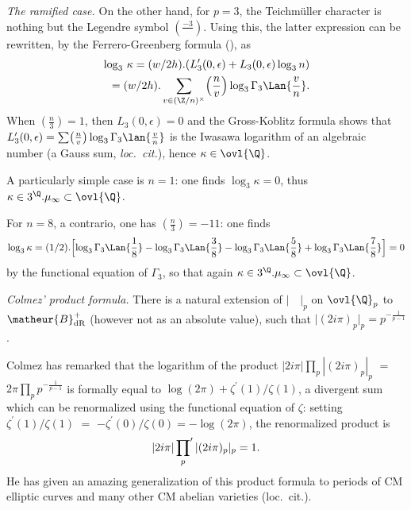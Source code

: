 \begin{para} {\itshape The ramified case.}
 On the other hand, for $p=3$,
the Teichm\"uller character is nothing but the Legendre symbol
$(\frac{-3}{{\,}})$. Using this, the latter expression can be rewritten,
by the Ferrero-Greenberg formula (\cf \cite[chap. 17]{cf1a2}), as
\begin{align*}
 \log_3\, \kappa = (w/2h) . (L'_3(0,\epsilon) +
 L_3(0,\epsilon)\log_3n)\\ =  (w/2h ) .\sum_{v\in ({\Z}/n)^{\times}} 
 \Bigl(\frac{n}{{v}}\Bigr)\log_3\Gamma_3 \Lan{\frac{v}{n}}.  
\end{align*} 
 When $(\frac{n}{{3}})=1$, then
$L_3(0,\epsilon)= 0$ and the Gross-Koblitz formula shows that
$L'_3(0,\epsilon)= \sum 
  \bigl(\frac{n}{{v}}\bigr)\log_3\Gamma_3 \lan{ \frac{v}{n}} $ is the
 Iwasawa logarithm of an algebraic number (a Gauss sum, {\it \cf
 loc.~cit.}), hence $\kappa\in \ovl{\Q}$.

 \noindent  A particularly simple case is $n=1$: one finds $\log_3
 \kappa=0$, thus $\kappa
 \in 3^\Q.\mu_\infty \subset \ovl{\Q}$.

 \medskip
 \noindent For $n=8$, a contrario, one has $(\frac{n}{{3}})=-11$: one finds  
 \begin{equation*} \log_3 \kappa = 
  (1/2).\Bigl[\log_3\Gamma_3 \Lan{\frac{1}{8}}-\log_3\Gamma_3
   \Lan{\frac{3}{8}}-\log_3\Gamma_3
   \Lan{\frac{5}{8}}+\log_3\Gamma_3 \Lan{\frac{7}{8}}\Bigr]=0
 \end{equation*}
 by the functional equation of
 $\Gamma_3$, so that again $\kappa
 \in 3^\Q.\mu_\infty \subset \ovl{\Q}$.
\end{para}


\begin{para} {\itshape Colmez' product formula.} There is a natural
 extension of $|\quad|_p$ on ${\ovl{\Q}}_p$ to
 $\matheur{B}^+_{\mathrm{dR}}$ (however not as an absolute value), such
 that $\vert (2i\pi)_p \vert_p = p^{-\frac{1}{p-1}}$
 \cf \cite{ufdpplpdvaamc}. 
 
 Colmez has remarked that the logarithm of the
 product $|2i\pi| \prod_p |(2i\pi)_p|_p $ $=$ $ 2\pi\prod_p
 p^{-\frac{1}{p-1}}$ 
 is formally equal to $\log (2\pi) + \zeta^{\prime}(1)/\zeta(1)$, a
 divergent sum which can be renormalized using the functional equation of
 $\zeta$: setting $\zeta^{\prime}(1)/\zeta(1)$ $=$ 
 $-\zeta^{\prime}(0)/\zeta(0)=-\log(2\pi)$, the renormalized product is
 \begin{equation*}
  |2i\pi| \sideset{}{'}\prod_p |(2i\pi)_p|_p = 1.
 \end{equation*}
 He has given an amazing generalization of this product formula to
 periods of CM elliptic curves and many other CM abelian varieties
 (loc.~cit.).
 \end{para}

